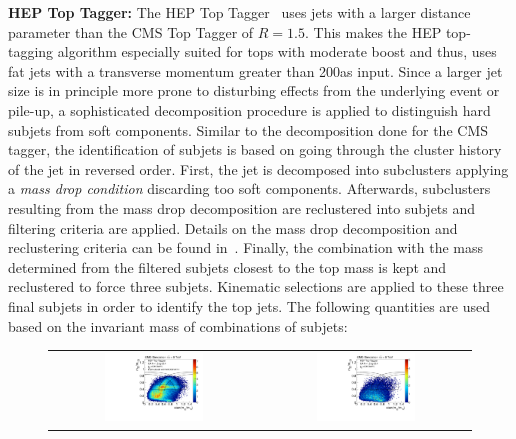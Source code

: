 \begin{description}
 \item \textbf{HEP Top Tagger:} The HEP Top Tagger~\cite{Plehn:2010st} uses jets with a larger distance parameter than the CMS Top Tagger of $R = 1.5$. This makes the HEP top-tagging algorithm especially suited for tops with moderate boost and thus, uses fat jets with a transverse momentum greater than 200\gev as input. Since a larger jet size is in principle more prone to disturbing effects from the underlying event or pile-up, a sophisticated decomposition procedure is applied to distinguish hard subjets from soft components. Similar to the decomposition done for the CMS tagger, the identification of subjets is based on going through the cluster history of the jet in reversed order. First, the jet is decomposed into subclusters applying a \textit{mass drop condition} discarding too soft components. Afterwards, subclusters resulting from the mass drop decomposition are reclustered into subjets and filtering criteria are applied. Details on the mass drop decomposition and reclustering criteria can be found in~\cite{CMS:2014fya}. Finally, the combination with the mass determined from the filtered subjets closest to the top mass is kept and reclustered to force three subjets. Kinematic selections are applied to these three final subjets in order to identify the top jets. The following quantities are used based on the invariant mass of combinations of subjets:
\begin{figure}[!tp]
  \centering 
  \begin{tabular}{cc}
    \includegraphics[width=0.49\textwidth]{figures/Pheno2DPlot_HTT2D_NOheptoptag_NOmasscut_hists_Signal_Add.pdf} & 
    \includegraphics[width=0.49\textwidth]{figures/Pheno2DPlot_HTT2D_NOheptoptag_NOmasscut_hists_Background_Add.pdf}

\end{tabular}
\end{figure}
\end{description}
